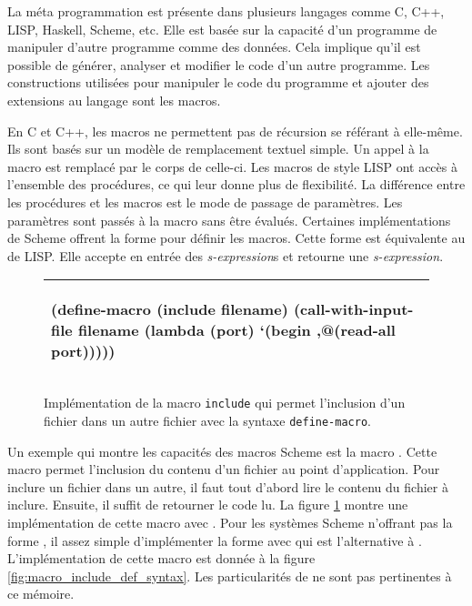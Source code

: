 La méta programmation est présente dans plusieurs langages comme C, C++, LISP,
Haskell, Scheme, etc. Elle est basée sur la capacité d'un programme de manipuler
d'autre programme comme des données. Cela implique qu'il est possible de
générer, analyser et modifier le code d'un autre programme.  Les
constructions utilisées pour manipuler le code du programme et
ajouter des extensions au langage sont les macros.

En C et C++, les macros ne permettent pas de récursion se référant à elle-même.
Ils sont basés sur un modèle de remplacement textuel simple. Un appel à la
macro est remplacé par le corps de celle-ci. Les macros de style LISP ont
accès à l'ensemble des procédures, ce qui leur donne plus de flexibilité.  La
différence entre les procédures et les macros est le mode de passage de
paramètres.  Les paramètres sont passés à la macro sans être évalués.
Certaines implémentations de Scheme offrent la forme
 pour définir les macros.  Cette forme est équivalente au
 de LISP. Elle accepte en entrée des \textit{s-expression}s et
retourne une \textit{s-expression}.

\begin{figure}[htbp]
  \begin{tabular}{|l|}\hline
\begin{mplisting}{0.7}
(define-macro (include filename)
  (call-with-input-file
    filename
    (lambda (port)
      `(begin
        ,@(read-all port)))))
\end{mplisting}\\\hline
\end{tabular}

  \caption{Implémentation de la macro \texttt{include} qui permet l'inclusion
  d'un fichier dans un autre fichier avec la syntaxe \texttt{define-macro}.}

  \label{fig:macro_include}
\end{figure}

Un exemple qui montre les capacités des macros Scheme est la macro
.  Cette macro permet l'inclusion du contenu d'un fichier au
point d'application.  Pour inclure un fichier dans un autre, il faut tout
d'abord lire le contenu du fichier à inclure. Ensuite, il suffit de retourner le
code lu. La figure \ref{fig:macro_include} montre une implémentation de cette
macro avec .  Pour les systèmes Scheme n'offrant
pas la forme , il assez simple d'implémenter
la forme  avec  qui est l'alternative à
. L'implémentation de cette macro est donnée à la figure
\ref{fig:macro_include_def_syntax}. Les particularités de
 ne sont pas pertinentes à ce mémoire.

